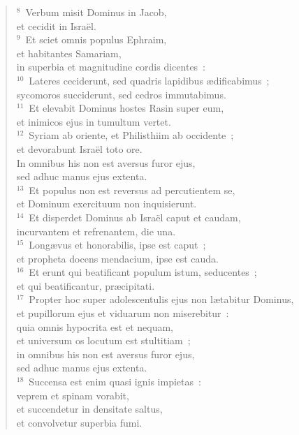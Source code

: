 \begin{verse}${}^{8}$~Verbum misit Dominus in Jacob,\\ et cecidit in Isra\"el.\\
${}^{9}$~Et sciet omnis populus Ephraim,\\ et habitantes Samariam,\\ in superbia et magnitudine cordis dicentes~:\\
${}^{10}$~Lateres ceciderunt, sed quadris lapidibus \ae dificabimus~;\\ sycomoros succiderunt, sed cedros immutabimus.\\
${}^{11}$~Et elevabit Dominus hostes Rasin super eum,\\ et inimicos ejus in tumultum vertet.\\
${}^{12}$~Syriam ab oriente, et Philisthiim ab occidente~;\\ et devorabunt Isra\"el toto ore.\\ In omnibus his non est aversus furor ejus,\\ sed adhuc manus ejus extenta.\\
${}^{13}$~Et populus non est reversus ad percutientem se,\\ et Dominum exercituum non inquisierunt.\\
${}^{14}$~Et disperdet Dominus ab Isra\"el caput et caudam,\\ incurvantem et refrenantem, die una.\\
${}^{15}$~Long\ae vus et honorabilis, ipse est caput~;\\ et propheta docens mendacium, ipse est cauda.\\
${}^{16}$~Et erunt qui beatificant populum istum, seducentes~;\\ et qui beatificantur, pr\ae cipitati.\\
${}^{17}$~Propter hoc super adolescentulis ejus non l\ae tabitur Dominus,\\ et pupillorum ejus et viduarum non miserebitur~:\\ quia omnis hypocrita est et nequam,\\ et universum os locutum est stultitiam~;\\ in omnibus his non est aversus furor ejus,\\ sed adhuc manus ejus extenta.\\
${}^{18}$~Succensa est enim quasi ignis impietas~:\\ veprem et spinam vorabit,\\ et succendetur in densitate saltus,\\ et convolvetur superbia fumi.\\

\end{verse}
